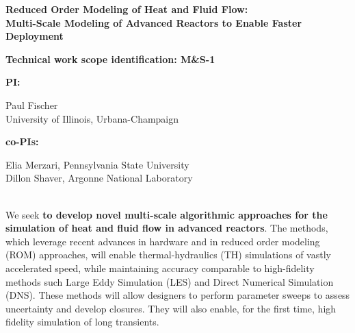 \parindent 0in
\parskip 0.1in

\begin{center}
{\bf Reduced Order Modeling of Heat and Fluid Flow: \\
Multi-Scale Modeling of Advanced Reactors to Enable Faster Deployment}
\\[-7ex]
\end{center}

{\bf Technical work scope identification: M\&S-1 }

{\bf PI: }\begin{minipage}[t]{2.8in}
Paul Fischer \\
University of Illinois, Urbana-Champaign 
\end{minipage}
{\bf co-PIs: } \begin{minipage}[t]{3in}
Elia Merzari, Pennsylvania State University \\
Dillon Shaver, Argonne National Laboratory \\[-1ex]
\end{minipage}

 \\[-4ex]


We seek \textbf{to develop novel multi-scale algorithmic approaches for the
simulation of heat and fluid flow in advanced reactors}. The methods, which
leverage recent advances in hardware and in reduced order modeling (ROM)
approaches, will enable thermal-hydraulics (TH) simulations of vastly
accelerated speed, while maintaining accuracy comparable to high-fidelity
methods such Large Eddy Simulation (LES) and Direct Numerical Simulation (DNS).
These methods will allow designers to perform parameter sweeps to assess
uncertainty and develop closures. They will also enable, for the first time,
high fidelity simulation of long transients.

